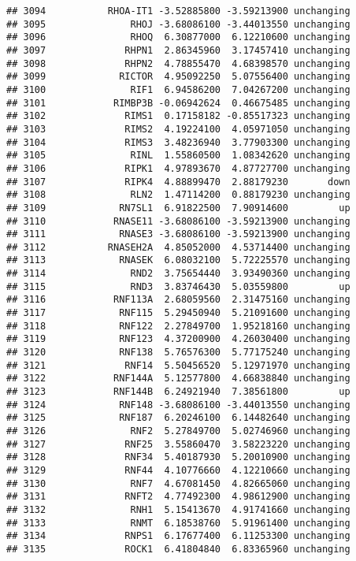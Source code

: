 \documentclass[]{article}
\begin{document}
\begin{verbatim}
## 3094           RHOA-IT1 -3.52885800 -3.59213900 unchanging
## 3095               RHOJ -3.68086100 -3.44013550 unchanging
## 3096               RHOQ  6.30877000  6.12210600 unchanging
## 3097              RHPN1  2.86345960  3.17457410 unchanging
## 3098              RHPN2  4.78855470  4.68398570 unchanging
## 3099             RICTOR  4.95092250  5.07556400 unchanging
## 3100               RIF1  6.94586200  7.04267200 unchanging
## 3101            RIMBP3B -0.06942624  0.46675485 unchanging
## 3102              RIMS1  0.17158182 -0.85517323 unchanging
## 3103              RIMS2  4.19224100  4.05971050 unchanging
## 3104              RIMS3  3.48236940  3.77903300 unchanging
## 3105               RINL  1.55860500  1.08342620 unchanging
## 3106              RIPK1  4.97893670  4.87727700 unchanging
## 3107              RIPK4  4.88899470  2.88179230       down
## 3108               RLN2  1.47114200  0.88179230 unchanging
## 3109             RN7SL1  6.91822500  7.90914600         up
## 3110            RNASE11 -3.68086100 -3.59213900 unchanging
## 3111             RNASE3 -3.68086100 -3.59213900 unchanging
## 3112           RNASEH2A  4.85052000  4.53714400 unchanging
## 3113             RNASEK  6.08032100  5.72225570 unchanging
## 3114               RND2  3.75654440  3.93490360 unchanging
## 3115               RND3  3.83746430  5.03559800         up
## 3116            RNF113A  2.68059560  2.31475160 unchanging
## 3117             RNF115  5.29450940  5.21091600 unchanging
## 3118             RNF122  2.27849700  1.95218160 unchanging
## 3119             RNF123  4.37200900  4.26030400 unchanging
## 3120             RNF138  5.76576300  5.77175240 unchanging
## 3121              RNF14  5.50456520  5.12971970 unchanging
## 3122            RNF144A  5.12577800  4.66838840 unchanging
## 3123            RNF144B  6.24921940  7.38561800         up
## 3124             RNF148 -3.68086100 -3.44013550 unchanging
## 3125             RNF187  6.20246100  6.14482640 unchanging
## 3126               RNF2  5.27849700  5.02746960 unchanging
## 3127              RNF25  3.55860470  3.58223220 unchanging
## 3128              RNF34  5.40187930  5.20010900 unchanging
## 3129              RNF44  4.10776660  4.12210660 unchanging
## 3130               RNF7  4.67081450  4.82665060 unchanging
## 3131              RNFT2  4.77492300  4.98612900 unchanging
## 3132               RNH1  5.15413670  4.91741660 unchanging
## 3133               RNMT  6.18538760  5.91961400 unchanging
## 3134              RNPS1  6.17677400  6.11253300 unchanging
## 3135              ROCK1  6.41804840  6.83365960 unchanging

\end{verbatim}
\end{document}
